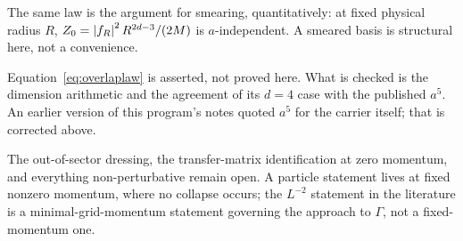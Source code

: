 The same law is the argument for smearing, quantitatively: at fixed
physical radius $R$, $Z_0 = \left\lvert f_R \right\rvert^2 R^{2d-3}/(2M)$ is
$a$-independent. A smeared basis is structural here, not a convenience.

\begin{scopenote}
Equation~\eqref{eq:overlaplaw} is asserted, not proved here. What is
checked is the dimension arithmetic and the agreement of its $d = 4$
case with the published $a^5$. An earlier version of this program's
notes quoted $a^5$ for the carrier itself; that is corrected above.
\end{scopenote}

\begin{scopenote}
The out-of-sector dressing, the transfer-matrix identification at zero
momentum, and everything non-perturbative remain open. A particle
statement lives at fixed nonzero momentum, where no collapse occurs; the
$L^{-2}$ statement in the literature is a minimal-grid-momentum
statement governing the approach to $\Gamma$, not a fixed-momentum one.
\end{scopenote}
